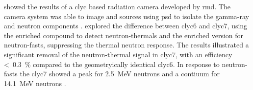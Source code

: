 \documentclass[../../../../main.tex]{subfiles}%
\begin{document}
    \citeauthor*{Whitney_2015} showed the results of a \gls{clyc} based radiation camera developed by \gls{rmd}.
    The camera system was able to image  and  sources using \gls{psd} to isolate the \gls{gamma-ray} and neutron components \cite{Whitney_2015}.
    \citeauthor*{Giaz_2016} explored the difference between \gls{clyc6} and \gls{clyc7}, using the  enriched compound to detect \glspl{neutron-thermal} and the  enriched version for \glspl{neutron-fast}, suppressing the thermal neutron response.
    The results illustrated a significant removal of the \gls{neutron-thermal} signal in \gls{clyc7}, with an efficiency \SI{0.3}[<]{\percent} compared to the geometryically identical \gls{clyc6}.
    In response to \glspl{neutron-fast} the \gls{clyc7} showed a peak for \SI{2.5}{\mega\electronvolt} neutrons and a contiuum for \SI{14.1}{\mega\electronvolt} neutrons \cite{Giaz_2016}.
\end{document}
